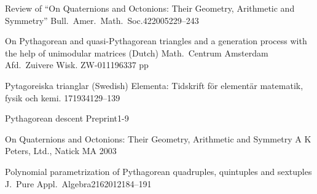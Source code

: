 \documentclass[12pt,table]{article}
\theoremstyle{definition}
\theoremstyle{remark}
\numberwithin{equation}{section}
\begin{document}
\begin{thebibliography}{1}



        {Review of ``On Quaternions and Octonions: 
         Their Geometry, Arithmetic and Symmetry''}
        {Bull.\ Amer.\ Math.\ Soc.}{42}{2005}{229--243}
        


      {On Pythagorean and quasi-Pythagorean triangles and a
      generation process with the help of unimodular matrices (Dutch)}
      {Math.\ Centrum Amsterdam Afd.\ Zuivere Wisk.}
      {ZW-011}{1963}{37 pp}



        {Pytagoreiska trianglar (Swedish)} 
        {Elementa: Tidskrift f\"or element\"ar
        matematik, fysik och kemi.}
        {17}{1934}{129--139}


        {Pythagorean descent}
        {}
        {}{Preprint}{1-9}



     {On Quaternions and Octonions: 
      Their Geometry, Arithmetic and Symmetry}
     {A K Peters, Ltd., Natick MA}
     {2003}

\begin{comment}

\bibitem{Davidoff_Sarnak_Valette}
\book{G.\ Davidoff, P.\ Sarnak, and A.\ Valette}
         {Elementary Number Theory,
           Group Theory,
           and Ramanujan Graphs}
         {Cambridge University Press}
         {2003}



\bibitem{Dickson}
\book{L.\ E.\ Dickson}
         {History of the Theory of Numbers}
         {AMS Chelsea Publishing}
         {1999}

\bibitem{Ehrenborg_2018}
\preprint{T.\ Ehrenborg}
        {Pythagorean Quintuples and Quaternions}
        {2018}




\bibitem{Ferrari}
\journal{F.\ Ferrari}
        {Risoluzione Dell'Equazione}
        {Supplemento al Periodico di Matematica}
        {11}{1908}{129--131}

\end{comment}

       {Polynomial parametrization of Pythagorean quadruples,
        quintuples and sextuples}
       {J.\ Pure Appl.\ Algebra}{216}{2012}{184--191}



\end{thebibliography}
\end{document}

